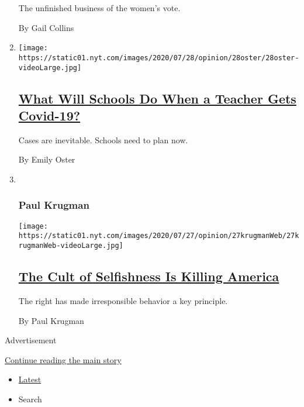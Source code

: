 \begin{enumerate}
  The unfinished business of the women's vote.

  By Gail Collins
\item
  \texttt{[image: https://static01.nyt.com/images/2020/07/28/opinion/28oster/28oster-videoLarge.jpg]}

  \hypertarget{what-will-schools-do-when-a-teacher-gets-covid-19}{%
  \subsection{\texorpdfstring{\href{/2020/07/28/opinion/coronavirus-schools-reopening.html}{What
  Will Schools Do When a Teacher Gets
  Covid-19?}}{What Will Schools Do When a Teacher Gets Covid-19?}}\label{what-will-schools-do-when-a-teacher-gets-covid-19}}

  Cases are inevitable. Schools need to plan now.

  By Emily Oster
\item ~
  \hypertarget{paul-krugman}{%
  \subsubsection{Paul Krugman}\label{paul-krugman}}

  \texttt{[image: https://static01.nyt.com/images/2020/07/27/opinion/27krugmanWeb/27krugmanWeb-videoLarge.jpg]}

  \hypertarget{the-cult-of-selfishness-is-killing-america}{%
  \subsection{\texorpdfstring{\href{/2020/07/27/opinion/us-republicans-coronavirus.html}{The
  Cult of Selfishness Is Killing
  America}}{The Cult of Selfishness Is Killing America}}\label{the-cult-of-selfishness-is-killing-america}}

  The right has made irresponsible behavior a key principle.

  By Paul Krugman
\end{enumerate}

Advertisement

\protect\hyperlink{after-mid1}{Continue reading the main story}

\begin{itemize}
\tightlist
\item
  \protect\hyperlink{stream-panel}{Latest}
\item
  Search
\end{itemize}

